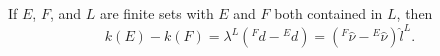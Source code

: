 If $E$, $F$, and $L$ are finite sets with $E$ and $F$ both contained in $L$, then
$$k(E) - k(F) = \lambda^L \left( {}^F d - {}^E d \right) = \left( {}^F \hat{\nu} - {}^E \hat{\nu} \right) \hat{l}^L.$$
